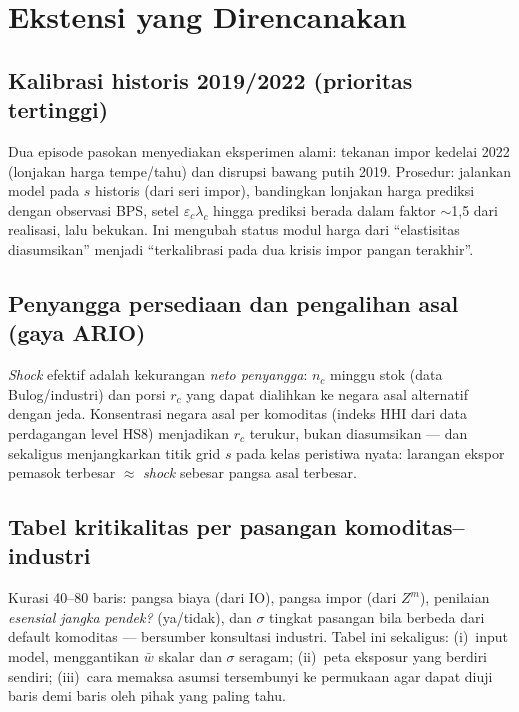 \documentclass[11pt,a4paper]{article}
\newcommand{\en}[1]{\textit{#1}}   %
\begin{document}
\section{Ekstensi yang Direncanakan}
\label{sec:ext}

\subsection{Kalibrasi historis 2019/2022 (prioritas tertinggi)}
Dua episode pasokan menyediakan eksperimen alami: tekanan impor kedelai
2022 (lonjakan harga tempe/tahu) dan disrupsi bawang putih 2019.
Prosedur: jalankan model pada $s$ historis (dari seri impor), bandingkan
lonjakan harga prediksi dengan observasi BPS, setel
$\varepsilon_c \lambda_c$ hingga prediksi berada dalam faktor
$\sim$1{,}5 dari realisasi, lalu bekukan. Ini mengubah status modul harga
dari ``elastisitas diasumsikan'' menjadi ``terkalibrasi pada dua krisis
impor pangan terakhir''.

\subsection{Penyangga persediaan dan pengalihan asal (gaya ARIO)}
\en{Shock} efektif adalah kekurangan \emph{neto penyangga}:
$n_c$ minggu stok (data Bulog/industri) dan porsi $r_c$ yang dapat
dialihkan ke negara asal alternatif dengan jeda. Konsentrasi negara asal
per komoditas (indeks HHI dari data perdagangan level HS8) menjadikan
$r_c$ terukur, bukan diasumsikan --- dan sekaligus menjangkarkan titik
grid $s$ pada kelas peristiwa nyata: larangan ekspor pemasok terbesar
$\approx$ \en{shock} sebesar pangsa asal terbesar.

\subsection{Tabel kritikalitas per pasangan komoditas--industri}
Kurasi 40--80 baris: pangsa biaya (dari IO), pangsa impor (dari $Z^m$),
penilaian \emph{esensial jangka pendek?} (ya/tidak), dan $\sigma$ tingkat
pasangan bila berbeda dari default komoditas --- bersumber konsultasi
industri. Tabel ini sekaligus: (i)~input model, menggantikan $\bar w$
skalar dan $\sigma$ seragam; (ii)~peta eksposur yang berdiri sendiri;
(iii)~cara memaksa asumsi tersembunyi ke permukaan agar dapat diuji baris
demi baris oleh pihak yang paling tahu.
\end{document}
